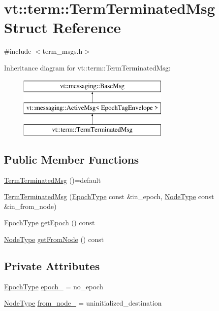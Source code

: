 \hypertarget{structvt_1_1term_1_1_term_terminated_msg}{}\section{vt\+:\+:term\+:\+:Term\+Terminated\+Msg Struct Reference}
\label{structvt_1_1term_1_1_term_terminated_msg}


{\ttfamily \#include $<$term\+\_\+msgs.\+h$>$}

Inheritance diagram for vt\+:\+:term\+:\+:Term\+Terminated\+Msg\+:\begin{figure}[H]
\begin{center}
\leavevmode
\includegraphics[height=3.000000cm]{structvt_1_1term_1_1_term_terminated_msg}
\end{center}
\end{figure}
\subsection*{Public Member Functions}
\begin{DoxyCompactItemize}
\item 
\hyperlink{structvt_1_1term_1_1_term_terminated_msg_aa4d8ff658de9fb4bca91ea687e4ebd9f}{Term\+Terminated\+Msg} ()=default
\item 
\hyperlink{structvt_1_1term_1_1_term_terminated_msg_a067b9cd70d084bb0767c41c8eb05aa29}{Term\+Terminated\+Msg} (\hyperlink{namespacevt_a81d11b28122d43bf9834577e4a06440f}{Epoch\+Type} const \&in\+\_\+epoch, \hyperlink{namespacevt_a866da9d0efc19c0a1ce79e9e492f47e2}{Node\+Type} const \&in\+\_\+from\+\_\+node)
\item 
\hyperlink{namespacevt_a81d11b28122d43bf9834577e4a06440f}{Epoch\+Type} \hyperlink{structvt_1_1term_1_1_term_terminated_msg_a9008729d246d7cde6ce7b5dfb2dfa204}{get\+Epoch} () const
\item 
\hyperlink{namespacevt_a866da9d0efc19c0a1ce79e9e492f47e2}{Node\+Type} \hyperlink{structvt_1_1term_1_1_term_terminated_msg_a61ee025b8d4918e81bee601a4e7a2c3d}{get\+From\+Node} () const
\end{DoxyCompactItemize}
\subsection*{Private Attributes}
\begin{DoxyCompactItemize}
\item 
\hyperlink{namespacevt_a81d11b28122d43bf9834577e4a06440f}{Epoch\+Type} \hyperlink{structvt_1_1term_1_1_term_terminated_msg_ad10f7149ea1e887e040c01ddcc671e35}{epoch\+\_\+} = no\+\_\+epoch
\item 
\hyperlink{namespacevt_a866da9d0efc19c0a1ce79e9e492f47e2}{Node\+Type} \hyperlink{structvt_1_1term_1_1_term_terminated_msg_a393564a84f3a77e1ab7b31ee8c368d5b}{from\+\_\+node\+\_\+} = uninitialized\+\_\+destination
\end{DoxyCompactItemize}
